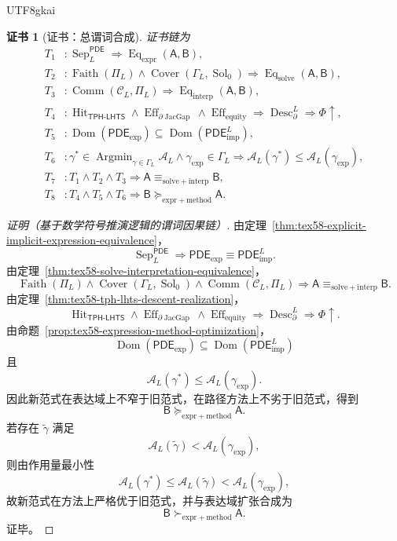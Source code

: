 \documentclass[12pt]{article}
\newtheorem{Certificate}{证书}[section]
\newcommand{\TPHLHTS}{\ensuremath{\mathsf{TPH\mbox{-}LHTS}}}
\newcommand{\PDE}{\ensuremath{\mathsf{PDE}}}
\DeclareMathOperator{\Sol}{Sol}
\DeclareMathOperator{\Eff}{Eff}
\DeclareMathOperator{\Hit}{Hit}
\DeclareMathOperator{\JacGap}{JacGap}
\DeclareMathOperator{\Eq}{Eq}
\DeclareMathOperator{\Sep}{Sep}
\DeclareMathOperator{\Faith}{Faith}
\DeclareMathOperator{\Cover}{Cover}
\DeclareMathOperator{\Comm}{Comm}
\DeclareMathOperator{\Desc}{Desc}
\DeclareMathOperator{\Dom}{Dom}
\DeclareMathOperator*{\Argmin}{Argmin}
\begin{document}
\begin{CJK*}{UTF8}{gkai}
\begin{Certificate}[证书：总谓词合成]
\label{cert:tex58-paradigm-migration-main}
证书链为
\[
\begin{aligned}
  T_1 &: \Sep_L^{\PDE}\Rightarrow
  \Eq_{\mathrm{expr}}(\mathsf A,\mathsf B),\\
  T_2 &: \Faith(\Pi_L)\wedge\Cover(\Gamma_L,\Sol_0)
  \Rightarrow
  \Eq_{\mathrm{solve}}(\mathsf A,\mathsf B),\\
  T_3 &: \Comm(\mathcal C_L,\Pi_L)
  \Rightarrow
  \Eq_{\mathrm{interp}}(\mathsf A,\mathsf B),\\
  T_4 &: \Hit_{\TPHLHTS}\wedge\Eff_{\partial\JacGap}\wedge\Eff_{\mathrm{equity}}
  \Rightarrow
  \Desc_{\partial}^{L}\Rightarrow\Phi\uparrow,\\
  T_5 &: \Dom(\PDE_{\mathrm{exp}})
  \subseteq
  \Dom(\PDE_{\mathrm{imp}}^L),\\
  T_6 &: \gamma^\ast\in\Argmin_{\gamma\in\Gamma_L}\mathcal A_L
  \wedge
  \gamma_{\mathrm{exp}}\in\Gamma_L
  \Rightarrow
  \mathcal A_L(\gamma^\ast)\le\mathcal A_L(\gamma_{\mathrm{exp}}),\\
  T_7 &: T_1\wedge T_2\wedge T_3
  \Rightarrow
  \mathsf A\equiv_{\mathrm{solve+interp}}\mathsf B,\\
  T_8 &: T_4\wedge T_5\wedge T_6
  \Rightarrow
  \mathsf B\succcurlyeq_{\mathrm{expr+method}}\mathsf A.
\end{aligned}
\]
\end{Certificate}

\begin{proof}[证明（基于数学符号推演逻辑的谓词因果链）]
由定理~\ref{thm:tex58-explicit-implicit-expression-equivalence}，
\[
  \Sep_L^{\PDE}
  \Rightarrow
  \PDE_{\mathrm{exp}}\equiv\PDE_{\mathrm{imp}}^L.
\]
由定理~\ref{thm:tex58-solve-interpretation-equivalence}，
\[
  \Faith(\Pi_L)
  \wedge
  \Cover(\Gamma_L,\Sol_0)
  \wedge
  \Comm(\mathcal C_L,\Pi_L)
  \Rightarrow
  \mathsf A\equiv_{\mathrm{solve+interp}}\mathsf B.
\]
由定理~\ref{thm:tex58-tph-lhts-descent-realization}，
\[
  \Hit_{\TPHLHTS}
  \wedge
  \Eff_{\partial\JacGap}
  \wedge
  \Eff_{\mathrm{equity}}
  \Rightarrow
  \Desc_{\partial}^{L}\Rightarrow\Phi\uparrow.
\]
由命题~\ref{prop:tex58-expression-method-optimization}，
\[
  \Dom(\PDE_{\mathrm{exp}})
  \subseteq
  \Dom(\PDE_{\mathrm{imp}}^L)
\]
且
\[
  \mathcal A_L(\gamma^\ast)
  \le
  \mathcal A_L(\gamma_{\mathrm{exp}}).
\]
因此新范式在表达域上不窄于旧范式，在路径方法上不劣于旧范式，得到
\[
  \mathsf B
  \succcurlyeq_{\mathrm{expr+method}}
  \mathsf A.
\]
若存在 \(\widetilde\gamma\) 满足
\[
  \mathcal A_L(\widetilde\gamma)
  <
  \mathcal A_L(\gamma_{\mathrm{exp}}),
\]
则由作用量最小性
\[
  \mathcal A_L(\gamma^\ast)
  \le
  \mathcal A_L(\widetilde\gamma)
  <
  \mathcal A_L(\gamma_{\mathrm{exp}}),
\]
故新范式在方法上严格优于旧范式，并与表达域扩张合成为
\[
  \mathsf B
  \succ_{\mathrm{expr+method}}
  \mathsf A.
\]
证毕。
\end{proof}


\end{CJK*}
\end{document}
